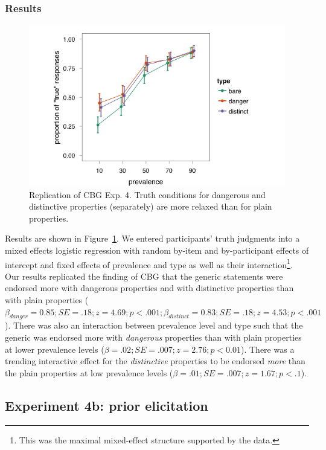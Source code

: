 \documentclass[10pt,letterpaper]{article}
\begin{document}
\subsubsection{Results}

\begin{figure}
\centering
    \includegraphics[width=0.8\columnwidth]{dd_separate_truthconds}
    \caption{Replication of CBG Exp. 4. Truth conditions for dangerous and distinctive properties (separately) are more relaxed than for plain properties.}
  \label{fig:ddseparate}
\end{figure}

Results are shown in Figure~\ref{fig:ddseparate}. We entered participants' truth judgments into a mixed effects logistic regression with random by-item and by-participant effects of intercept and fixed effects of prevalence and type as well as their interaction\footnote{This was the maximal mixed-effect structure supported by the data.}.  
%
Our results replicated the finding of CBG that the generic statements were endorsed more with dangerous properties and with distinctive properties than with plain properties ($\beta_{danger}=0.85; SE = .18; z = 4.69; p < .001; \beta_{distinct}=0.83; SE = .18; z = 4.53; p < .001$). 
%
There was also an interaction between prevalence level and type such that the generic was endorsed more with \emph{dangerous} properties than with plain properties at lower prevalence levels ($\beta=.02; SE = .007; z=2.76; p < 0.01$). There was a trending interactive effect for the \emph{distinctive} properties to be endorsed \emph{more} than the plain properties at low prevalence levels ($\beta=.01; SE = .007; z=1.67; p < .1$).


\subsection{Experiment 4b: prior elicitation}
\end{document}
